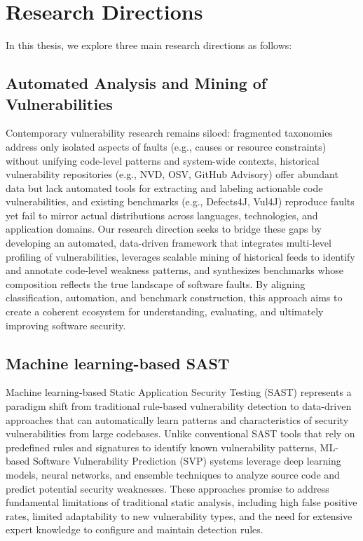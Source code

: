 \section{Research Directions} \label{sec:se1}

In this thesis, we explore three main research directions as follows:

\subsection*{Automated Analysis and Mining of Vulnerabilities}

Contemporary vulnerability research remains siloed: fragmented taxonomies address only isolated aspects of faults (e.g., causes or resource constraints) without unifying code-level patterns and system-wide contexts, historical vulnerability repositories (e.g., NVD, OSV, GitHub Advisory) offer abundant data but lack automated tools for extracting and labeling actionable code vulnerabilities, and existing benchmarks (e.g., Defects4J, Vul4J) reproduce faults yet fail to mirror actual distributions across languages, technologies, and application domains. Our research direction seeks to bridge these gaps by developing an automated, data-driven framework that integrates multi‐level profiling of vulnerabilities, leverages scalable mining of historical feeds to identify and annotate code‐level weakness patterns, and synthesizes benchmarks whose composition reflects the true landscape of software faults. By aligning classification, automation, and benchmark construction, this approach aims to create a coherent ecosystem for understanding, evaluating, and ultimately improving software security.

\subsection*{Machine learning-based SAST}

Machine learning-based Static Application Security Testing (SAST) represents a paradigm shift from traditional rule-based vulnerability detection to data-driven approaches that can automatically learn patterns and characteristics of security vulnerabilities from large codebases. Unlike conventional SAST tools that rely on predefined rules and signatures to identify known vulnerability patterns, ML-based Software Vulnerability Prediction (SVP) systems leverage deep learning models, neural networks, and ensemble techniques to analyze source code and predict potential security weaknesses. These approaches promise to address fundamental limitations of traditional static analysis, including high false positive rates, limited adaptability to new vulnerability types, and the need for extensive expert knowledge to configure and maintain detection rules.

